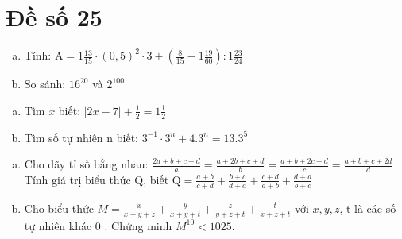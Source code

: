 \onehalfspacing
\section{Đề số 25}

\begin{bt} 
    \hfill
   \begin{enumerate}[a.]
    \item Tính: $\mathrm{A}=1 \frac{13}{15} \cdot(0,5)^2 \cdot 3+\left(\frac{8}{15}-1 \frac{19}{60}\right): 1 \frac{23}{24}$
    \item So sánh: $16^{20}$ và $2^{100}$
   \end{enumerate}
\loigiai{}
\end{bt}

\begin{bt}
    \hfill
	\begin{enumerate}[a.]
        \item Tìm $x$ biết: $|2 x-7|+\frac{1}{2}=1 \frac{1}{2}$
        \item Tìm số tự nhiên $\mathrm{n}$ biết: $3^{-1} \cdot 3^n+4.3^n=13.3^5$
    \end{enumerate}
	\loigiai{} 
\end{bt}

\begin{bt}
    \hfill
    \begin{enumerate}[a.]
        \item Cho dãy tỉ số bằng nhau: $\frac{2 a+b+c+d}{a}=\frac{a+2 b+c+d}{b}=\frac{a+b+2 c+d}{c}=\frac{a+b+c+2 d}{d}$ Tính giá trị biểu thức $\mathrm{Q}$, biết $\mathrm{Q}=\frac{a+b}{c+d}+\frac{b+c}{d+a}+\frac{c+d}{a+b}+\frac{d+a}{b+c}$
        \item Cho biểu thức $M=\frac{x}{x+y+z}+\frac{y}{x+y+t}+\frac{z}{y+z+t}+\frac{t}{x+z+t}$ với $x, y, z$, t là các số tự nhiên khác 0 . Chứng minh $M^{10}<1025$.
    \end{enumerate}
	\loigiai{}
\end{bt}

